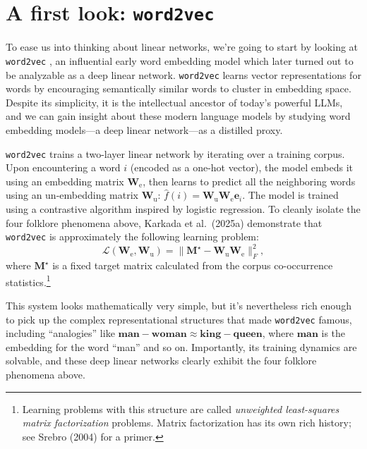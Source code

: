 \documentclass[12pt]{article}
\newcommand{\ve}{\mathbf{e}}
\newcommand{\mW}{\mathbf{W}}
\newcommand{\mM}{\mathbf{M}}
\begin{document}
\section{A first look: \texttt{word2vec}}

To ease us into thinking about linear networks, we're going to start by looking at \texttt{word2vec} \cite{mikolov2013word2vec}, an influential early word embedding model which later turned out to be analyzable as a deep linear network. \texttt{word2vec} learns vector representations for words by encouraging semantically similar words to cluster in embedding space. Despite its simplicity, it is the intellectual ancestor of today's powerful LLMs, and we can gain insight about these modern language models by studying word embedding models---a deep linear network---as a distilled proxy.

\texttt{word2vec} trains a two-layer linear network by iterating over a training corpus. Upon encountering a word $i$ (encoded as a one-hot vector), the model embeds it using an embedding matrix $\mW_\text{e}$, then learns to predict all the neighboring words using an un-embedding matrix $\mW_\text{u}$: $\hat{f}(i) = \mW_\text{u} \mW_\text{e} \ve_i$. The model is trained using a contrastive algorithm inspired by logistic regression. To cleanly isolate the four folklore phenomena above, Karkada et al.\ (2025a) demonstrate that \texttt{word2vec} is approximately the following learning problem:
\begin{equation}
    \mathcal{L}(\mW_\text{e}, \mW_\text{u}) = \|\mM^\star - \mW_\text{u} \mW_\text{e} \|_F^2,
\end{equation}
where $\mM^\star$ is a fixed target matrix calculated from the corpus co-occurrence statistics.\footnote{Learning problems with this structure are called \emph{unweighted least-squares matrix factorization} problems. Matrix factorization has its own rich history; see Srebro (2004) for a primer.}

This system looks mathematically very simple, but it's nevertheless rich enough to pick up the complex representational structures that made \texttt{word2vec} famous, including ``analogies'' like $\mathbf{man} - \mathbf{woman} \approx \mathbf{king} - \mathbf{queen}$, where $\mathbf{man}$ is the embedding for the word ``man'' and so on. Importantly, its training dynamics are solvable, and these deep linear networks clearly exhibit the four folklore phenomena above.
\end{document}
